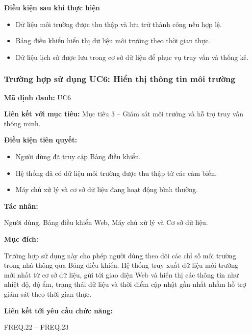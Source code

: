 \documentclass[a4paper,12pt]{article}
\begin{document}
\textbf{Điều kiện sau khi thực hiện}

\begin{itemize}
    \item Dữ liệu môi trường được thu thập và lưu trữ thành công nếu hợp lệ.
    \item Bảng điều khiển hiển thị dữ liệu môi trường theo thời gian thực.
    \item Dữ liệu lịch sử được lưu trong cơ sở dữ liệu để phục vụ truy vấn và thống kê.
\end{itemize}

\subsubsection{Trường hợp sử dụng UC6: Hiển thị thông tin môi trường}

\textbf{Mã định danh:} UC6

\textbf{Liên kết với mục tiêu:} Mục tiêu 3 -- Giám sát môi trường và hỗ trợ truy vấn thông minh.

\textbf{Điều kiện tiên quyết:}
\begin{itemize}
    \item Người dùng đã truy cập Bảng điều khiển.
    \item Hệ thống đã có dữ liệu môi trường được thu thập từ các cảm biến.
    \item Máy chủ xử lý và cơ sở dữ liệu đang hoạt động bình thường.
\end{itemize}

\textbf{Tác nhân:}

Người dùng, Bảng điều khiển Web, Máy chủ xử lý và Cơ sở dữ liệu.

\textbf{Mục đích:}

Trường hợp sử dụng này cho phép người dùng theo dõi các chỉ số môi trường trong nhà thông qua Bảng điều khiển. Hệ thống truy xuất dữ liệu môi trường mới nhất từ cơ sở dữ liệu, gửi tới giao diện Web và hiển thị các thông tin như nhiệt độ, độ ẩm, trạng thái dữ liệu và thời điểm cập nhật gần nhất nhằm hỗ trợ giám sát theo thời gian thực.

\textbf{Liên kết tới yêu cầu chức năng:}

FREQ.22 -- FREQ.23
\end{document}
